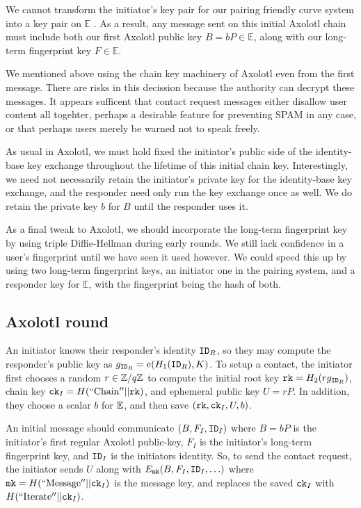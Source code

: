 \documentclass[twoside,letterpaper]{sig-alternate}
\begin{document}
We cannot transform the initiator's key pair for
 our pairing friendly curve system
into a key pair on $\mathbb{E}$ \cite{??no_homomorphism??}.
As a result, any message sent on this initial Axolotl chain must include
both our first Axolotl public key $B = b P \in \mathbb{E}$, along with
 our long-term fingerprint key $F \in \mathbb{E}$.

We mentioned above using the chain key machinery of Axolotl even from
the first message.  There are risks in this decission because the
authority can decrypt these messages.  It appears sufficent that
contact request messages either disallow user content all togehter,
perhaps a desirable feature for preventing SPAM in any case, or that 
perhaps users merely be warned not to speak freely.

As usual in Axolotl, we must hold fixed the initiator's public side of
the identity-base key exchange throughout the lifetime of this initial
chain key.  Interestingly, we need not necessarily retain the 
initiator's private key for the identity-base key exchange, and
 the responder need only run the key exchange once as well.
We do retain the private key $b$ for $B$ until the responder uses it.

As a final tweak to Axolotl, we should incorporate the long-term
fingerprint key by using triple Diffie-Hellman during early rounds.
We still lack confidence in a user's fingerprint until
we have seen it used however.
We could speed this up by using two long-term fingerprint keys,
an initiator one in the pairing system, and
 a responder key for $\mathbb{E}$,
with the fingerprint being the hash of both.

\subsection{Axolotl round} %

An initiator knows their responder's identity $\mathtt{ID}_R$, so they may
compute the responder's public key as $g_{\mathtt{ID}_R} = e(H_1(\mathtt{ID}_R),K)$.
To setup a contact, the initiator first chooses a random $r \in \mathbb{Z}/q\mathbb{Z}$
to compute the initial root key $\mathtt{rk} = H_2( r g_{\mathtt{ID}_R} )$,
chain key $\mathtt{ck}_I = H(\mathrm{``Chain''} || \mathtt{rk})$, and
ephemeral public key $U = r P$.
In addition, they choose a scalar $b$ for $\mathbb{E}$,
 and then save $(\mathtt{rk},\mathtt{ck}_I,U,b)$.

An initial message should communicate $(B,F_I,\mathtt{ID}_I)$ where 
 $B = b P$ is the initiator's first regular Axolotl public-key,
 $F_I$ is the initiator's long-term fingerprint key, and
 $\mathtt{ID}_I$ is the initiators identity.
So, to send the contact request, the initiator
sends $U$ along with $E_{\mathtt{mk}}(B,F_I,\mathtt{ID}_I,\ldots)$ where 
 $\mathtt{mk} = H(\mathrm{``Message''}  || \mathtt{ck}_I)$ is the message key,
and replaces the saved $\mathtt{ck}_I$ with $H(\mathrm{``Iterate''} || \mathtt{ck}_I)$.
\end{document}
